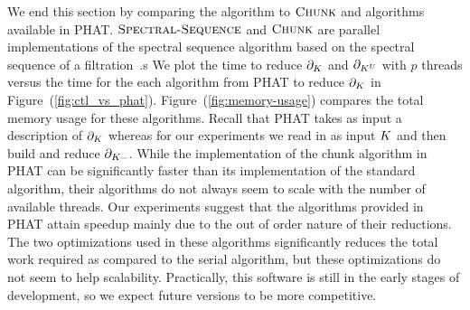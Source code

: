 We end this section by comparing the \mv algorithm to $\textnormal{\scshape Chunk}$ and  algorithms available in PHAT.
$\textnormal{\scshape Spectral-Sequence}$ and $\textnormal{\scshape Chunk}$ are parallel implementations of the spectral sequence algorithm based on the spectral sequence of a filtration~\cite{bkr-cccph-13}.s
We plot the time to reduce $\partial_{K}$ and $\partial_{K^U}$ with $p$ threads versus the time for the each algorithm from PHAT to reduce 
$\partial_{K}$ in Figure~(\ref{fig:ctl_vs_phat}). 
Figure~(\ref{fig:memory-usage}) compares the total memory usage for these algorithms. Recall that PHAT takes as input
a description of $\partial_{K}$ whereas for our experiments we read in as input $K$ and then build and reduce $\partial_{K^{\_}}$. 
While the implementation of the chunk algorithm in PHAT can be significantly faster than its implementation of the standard algorithm,
their algorithms do not always seem to scale with the number of available threads. Our experiments suggest that the algorithms 
provided in PHAT attain speedup mainly due to the out of order nature of their reductions. The two optimizations used
in these algorithms significantly reduces the total work required as compared to the serial algorithm, but these optimizations 
do not seem to help scalability.  Practically, this software is still in the early stages of development, so we expect future versions to 
be more competitive.
